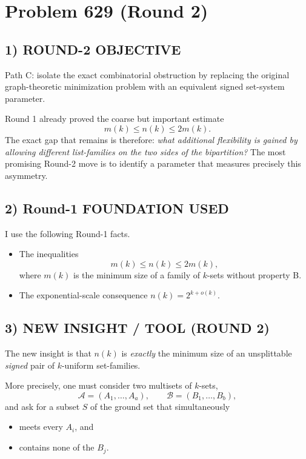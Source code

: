 \section{Problem 629 (Round 2)}

\subsection*{1) ROUND-2 OBJECTIVE}

Path C: isolate the exact combinatorial obstruction by replacing the original graph-theoretic minimization problem with an equivalent signed set-system parameter.

Round 1 already proved the coarse but important estimate
\[
m(k)\le n(k)\le 2m(k).
\]
The exact gap that remains is therefore: \emph{what additional flexibility is gained by allowing different list-families on the two sides of the bipartition?}
The most promising Round-2 move is to identify a parameter that measures precisely this asymmetry.

\subsection*{2) Round-1 FOUNDATION USED}

I use the following Round-1 facts.

\begin{itemize}
\item The inequalities
\[
m(k)\le n(k)\le 2m(k),
\]
where \(m(k)\) is the minimum size of a family of \(k\)-sets without property B.
\item The exponential-scale consequence \(n(k)=2^{k+o(k)}\).
\end{itemize}

\subsection*{3) NEW INSIGHT / TOOL (ROUND 2)}

The new insight is that \(n(k)\) is \emph{exactly} the minimum size of an unsplittable
\emph{signed} pair of \(k\)-uniform set-families.

More precisely, one must consider two multisets of \(k\)-sets,
\[
\mathcal A=(A_1,\dots,A_a),\qquad \mathcal B=(B_1,\dots,B_b),
\]
and ask for a subset \(S\) of the ground set that simultaneously

\begin{itemize}
\item meets every \(A_i\), and
\item contains none of the \(B_j\).
\end{itemize}

